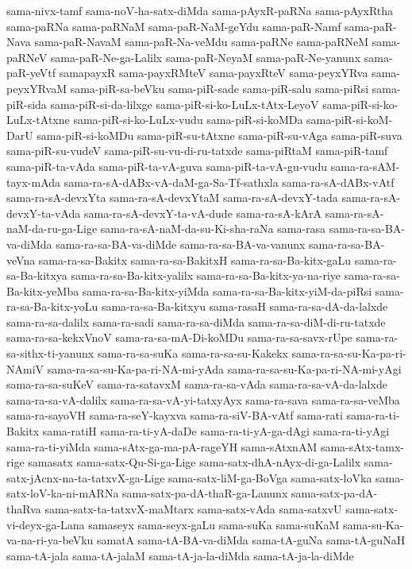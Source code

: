 {sama-nivx-tamf
sama-noV-ha-satx-diMda
sama-pAyxR-paRNa
sama-pAyxRtha
sama-paRNa
sama-paRNaM
sama-paR-NaM-geYdu
sama-paR-Namf
sama-paR-Nava
sama-paR-NavaM
sama-paR-Na-veMdu
sama-paRNe
sama-paRNeM
sama-paRNeV
sama-paR-Ne-ga-Lalilx
sama-paR-NeyaM
sama-paR-Ne-yanunx
sama-paR-yeVtf
samapayxR
sama-payxRMteV
sama-payxRteV
sama-peyxYRva
sama-peyxYRvaM
sama-piR-sa-beVku
sama-piR-sade
sama-piR-salu
sama-piRsi
sama-piR-sida
sama-piR-si-da-lilxge
sama-piR-si-ko-LuLx-tAtx-LeyoV
sama-piR-si-ko-LuLx-tAtxne
sama-piR-si-ko-LuLx-vudu
sama-piR-si-koMDa
sama-piR-si-koM-DarU
sama-piR-si-koMDu
sama-piR-su-tAtxne
sama-piR-su-vAga
sama-piR-suva
sama-piR-su-vudeV
sama-piR-su-vu-di-ru-tatxde
sama-piRtaM
sama-piR-tamf
sama-piR-ta-vAda
sama-piR-ta-vA-guva
sama-piR-ta-vA-gu-vudu
sama-ra-sAM-tayx-mAda
sama-ra-sA-dABx-vA-daM-ga-Sa-Tf-sathxla
sama-ra-sA-dABx-vAtf
sama-ra-sA-devxYta
sama-ra-sA-devxYtaM
sama-ra-sA-devxY-tada
sama-ra-sA-devxY-ta-vAda
sama-ra-sA-devxY-ta-vA-dude
sama-ra-sA-kArA
sama-ra-sA-naM-da-ru-ga-Lige
sama-ra-sA-naM-da-su-Ki-sha-raNa
sama-rasa
sama-ra-sa-BA-va-diMda
sama-ra-sa-BA-va-diMde
sama-ra-sa-BA-va-vanunx
sama-ra-sa-BA-veVna
sama-ra-sa-Bakitx
sama-ra-sa-BakitxH
sama-ra-sa-Ba-kitx-gaLu
sama-ra-sa-Ba-kitxya
sama-ra-sa-Ba-kitx-yalilx
sama-ra-sa-Ba-kitx-ya-na-riye
sama-ra-sa-Ba-kitx-yeMba
sama-ra-sa-Ba-kitx-yiMda
sama-ra-sa-Ba-kitx-yiM-da-piRsi
sama-ra-sa-Ba-kitx-yoLu
sama-ra-sa-Ba-kitxyu
sama-rasaH
sama-ra-sa-dA-da-lalxde
sama-ra-sa-dalilx
sama-ra-sadi
sama-ra-sa-diMda
sama-ra-sa-diM-di-ru-tatxde
sama-ra-sa-kekxVnoV
sama-ra-sa-mA-Di-koMDu
sama-ra-sa-savx-rUpe
sama-ra-sa-sithx-ti-yanunx
sama-ra-sa-suKa
sama-ra-sa-su-Kakekx
sama-ra-sa-su-Ka-pa-ri-NAmiV
sama-ra-sa-su-Ka-pa-ri-NA-mi-yAda
sama-ra-sa-su-Ka-pa-ri-NA-mi-yAgi
sama-ra-sa-suKeV
sama-ra-satavxM
sama-ra-sa-vAda
sama-ra-sa-vA-da-lalxde
sama-ra-sa-vA-dalilx
sama-ra-sa-vA-yi-tatxyAyx
sama-ra-sava
sama-ra-sa-veMba
sama-ra-sayoVH
sama-ra-seY-kayxva
sama-ra-siV-BA-vAtf
sama-rati
sama-ra-ti-Bakitx
sama-ratiH
sama-ra-ti-yA-daDe
sama-ra-ti-yA-ga-dAgi
sama-ra-ti-yAgi
sama-ra-ti-yiMda
sama-sAtx-ga-ma-pA-rageYH
sama-sAtxnAM
sama-sAtx-tamx-rige
samasatx
sama-satx-Qu-Si-ga-Lige
sama-satx-dhA-nAyx-di-ga-Lalilx
sama-satx-jAcnx-na-ta-tatxvX-ga-Lige
sama-satx-liM-ga-BoVga
sama-satx-loVka
sama-satx-loV-ka-ni-mARNa
sama-satx-pa-dA-thaR-ga-Lanunx
sama-satx-pa-dA-thaRva
sama-satx-ta-tatxvX-maMtarx
sama-satx-vAda
sama-satxvU
sama-satx-vi-deyx-ga-Lana
samaseyx
sama-seyx-gaLu
sama-suKa
sama-suKaM
sama-su-Ka-va-na-ri-ya-beVku
samatA
sama-tA-BA-va-diMda
sama-tA-guNa
sama-tA-guNaH
sama-tA-jala
sama-tA-jalaM
sama-tA-ja-la-diMda
sama-tA-ja-la-diMde
}
